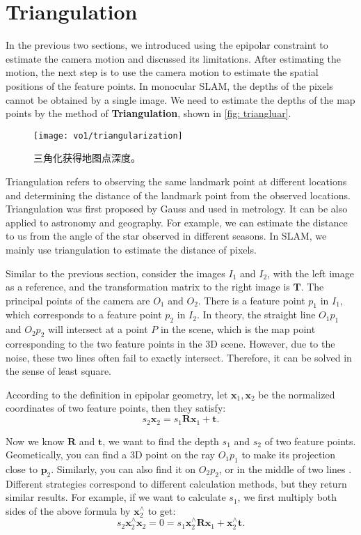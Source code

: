 \section{Triangulation}
In the previous two sections, we introduced using the epipolar constraint to estimate the camera motion and discussed its limitations. After estimating the motion, the next step is to use the camera motion to estimate the spatial positions of the feature points. In monocular SLAM, the depths of the pixels cannot be obtained by a single image. We need to estimate the depths of the map points by the method of \textbf{Triangulation}, shown in \autoref{fig: triangluar}.

\begin{figure}[!ht]
	\centering
	\texttt{[image: vo1/triangularization]}
	\caption{三角化获得地图点深度。}
	\label{fig:triangluar}
\end{figure}

Triangulation refers to observing the same landmark point at different locations and determining the distance of the landmark point from the observed locations. Triangulation was first proposed by Gauss and used in metrology. It can be also applied to astronomy and geography. For example, we can estimate the distance to us from the angle of the star observed in different seasons. In SLAM, we mainly use triangulation to estimate the distance of pixels.

Similar to the previous section, consider the images $I_{1}$ and $I_{2}$, with the left image as a reference, and the transformation matrix to the right image is $\bm{T}$. The principal points of the camera are $O_{1}$ and $O_{2}$. There is a feature point $p_{1}$ in $I_{1}$, which corresponds to a feature point $p_{2}$ in $I_{2}$. In theory, the straight line $O_{1}p_{1}$ and $O_{2}p_{2}$ will intersect at a point $P$ in the scene, which is the map point corresponding to the two feature points in the 3D scene. However, due to the noise, these two lines often fail to exactly intersect. Therefore, it can be solved in the sense of least square.

According to the definition in epipolar geometry, let $\bm{x}_1, \bm{x}_2$ be the normalized coordinates of two feature points, then they satisfy:
\begin{equation}
s_2 \bm{x}_2 = s_1  \bm{R} \bm{x}_1 + \bm{t}.  
\end{equation}

Now we know $\bm{R}$ and $\bm{t}$, we want to find the depth $s_1$ and $s_2$ of two feature points. Geometically, you can find a 3D point on the ray $O_1 p_1$ to make its projection close to $\bm{p}_2$. Similarly, you can also find it on $O_2 p_2$, or in the middle of two lines . Different strategies correspond to different calculation methods, but they return similar results. For example, if we want to calculate $s_1$, we first multiply both sides of the above formula by $\bm{x}_2^\wedge$ to get:
\begin{equation}
\label{eq:x1tox2}
s_2 \bm{x}_2^\wedge \bm{x}_2 = 0 = s_1 \bm{x}_2^\wedge \bm{R} \bm{x}_1 + \bm{x}_2^\wedge \bm{t}. 
\end{equation}

